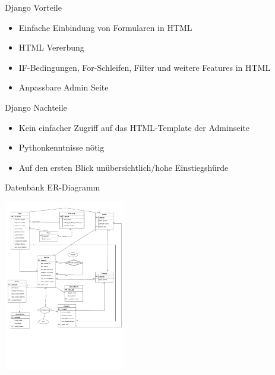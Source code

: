 \documentclass[english,hangout]{beamer}
\begin{document}
\begin{frame}{Django Vorteile}
\begin{itemize}
 \item Einfache Einbindung von Formularen in HTML
 \item HTML Vererbung
 \item IF-Bedingungen, For-Schleifen, Filter und weitere Features in HTML
 \item Anpassbare Admin Seite
\end{itemize}
\end{frame}

\begin{frame}{Django Nachteile}
\begin{itemize}
 \item Kein einfacher Zugriff auf das HTML-Template der Adminseite
 \item Pythonkenntnisse nötig
 \item Auf den ersten Blick unübersichtlich/hohe Einstiegshürde
\end{itemize}
\end{frame}

\begin{frame}{Datenbank ER-Diagramm}
 \begin{center}
\includegraphics[height=7.5cm]{dynexgen-erd.pdf}
\end{center}
\vspace{-6mm}
\end{frame}
\end{document}
